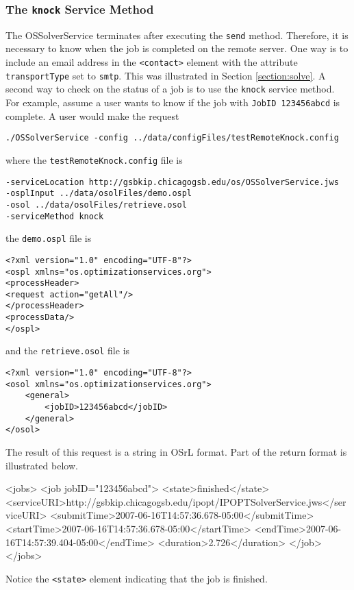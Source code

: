 \documentclass[11pt]{article}
\renewcommand{\_}{{\char"5F}}
\renewcommand{\{}{{\char"7B}}
\renewcommand{\}}{{\char"7D}}
\renewcommand{\^}{{\char"0D}}
\renewcommand{\'}{{\char"0D}}
\begin{document}
\subsubsection{The  {\tt knock} Service Method}\label{section:knock}

The OSSolverService terminates after executing the {\tt send} method. Therefore, it is necessary to know when the job is completed on the remote server. One way is to include an email address in the  {\tt <contact>}  element with the attribute {\tt transportType}     set to {\tt smtp}.  This was illustrated in Section \ref{section:solve}.  A second way to check on the status of a job is to use the {\tt knock} service method.  For example, assume a user   wants to know if  the job with {\tt JobID 123456abcd}  is complete. A user would make the request
\begin{verbatim}
./OSSolverService -config ../data/configFiles/testRemoteKnock.config
\end{verbatim}
where the {\tt testRemoteKnock.config} file is
\begin{verbatim}
-serviceLocation http://gsbkip.chicagogsb.edu/os/OSSolverService.jws
-osplInput ../data/osolFiles/demo.ospl
-osol ../data/osolFiles/retrieve.osol
-serviceMethod knock
\end{verbatim}
the {\tt demo.ospl} file is
\begin{verbatim}
<?xml version="1.0" encoding="UTF-8"?>
<ospl xmlns="os.optimizationservices.org">
<processHeader>
<request action="getAll"/>
</processHeader>
<processData/>
</ospl>
\end{verbatim}
and the {\tt retrieve.osol} file is
\begin{verbatim}
<?xml version="1.0" encoding="UTF-8"?>
<osol xmlns="os.optimizationservices.org">
 	<general>         
 		<jobID>123456abcd</jobID>  
	</general>
</osol>
\end{verbatim}
The result of this request is a string in OSrL format.  Part of the return format is illustrated below.
\begin{verbatimtab}[4]
<jobs>
	<job jobID="123456abcd">
		<state>finished</state>
		<serviceURI>http://gsbkip.chicagogsb.edu/ipopt/IPOPTSolverService.jws</serviceURI>
		<submitTime>2007-06-16T14:57:36.678-05:00</submitTime>
		<startTime>2007-06-16T14:57:36.678-05:00</startTime>
		<endTime>2007-06-16T14:57:39.404-05:00</endTime>
		<duration>2.726</duration>
 </job>
</jobs>
\end{verbatimtab}
Notice the {\tt <state>} element indicating that the job is finished.   
\end{document}
